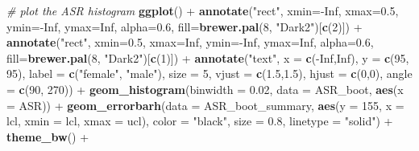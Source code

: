 \documentclass[]{article}
\newenvironment{Shaded}{\begin{snugshade}}{\end{snugshade}}
\newcommand{\KeywordTok}[1]{\textcolor[rgb]{0.13,0.29,0.53}{\textbf{{#1}}}}
\newcommand{\DataTypeTok}[1]{\textcolor[rgb]{0.13,0.29,0.53}{{#1}}}
\newcommand{\DecValTok}[1]{\textcolor[rgb]{0.00,0.00,0.81}{{#1}}}
\newcommand{\FloatTok}[1]{\textcolor[rgb]{0.00,0.00,0.81}{{#1}}}
\newcommand{\StringTok}[1]{\textcolor[rgb]{0.31,0.60,0.02}{{#1}}}
\newcommand{\CommentTok}[1]{\textcolor[rgb]{0.56,0.35,0.01}{\textit{{#1}}}}
\newcommand{\OtherTok}[1]{\textcolor[rgb]{0.56,0.35,0.01}{{#1}}}
\newcommand{\NormalTok}[1]{{#1}}
\begin{document}
\begin{Shaded}
\begin{Highlighting}[]
\CommentTok{# plot the ASR histogram}
\KeywordTok{ggplot}\NormalTok{() +}
\StringTok{  }\KeywordTok{annotate}\NormalTok{(}\StringTok{"rect"}\NormalTok{, }\DataTypeTok{xmin=}\NormalTok{-}\OtherTok{Inf}\NormalTok{, }\DataTypeTok{xmax=}\FloatTok{0.5}\NormalTok{, }\DataTypeTok{ymin=}\NormalTok{-}\OtherTok{Inf}\NormalTok{, }\DataTypeTok{ymax=}\OtherTok{Inf}\NormalTok{, }\DataTypeTok{alpha=}\FloatTok{0.6}\NormalTok{,}
           \DataTypeTok{fill=}\KeywordTok{brewer.pal}\NormalTok{(}\DecValTok{8}\NormalTok{, }\StringTok{"Dark2"}\NormalTok{)[}\KeywordTok{c}\NormalTok{(}\DecValTok{2}\NormalTok{)]) +}
\StringTok{  }\KeywordTok{annotate}\NormalTok{(}\StringTok{"rect"}\NormalTok{, }\DataTypeTok{xmin=}\FloatTok{0.5}\NormalTok{, }\DataTypeTok{xmax=}\OtherTok{Inf}\NormalTok{, }\DataTypeTok{ymin=}\NormalTok{-}\OtherTok{Inf}\NormalTok{, }\DataTypeTok{ymax=}\OtherTok{Inf}\NormalTok{, }\DataTypeTok{alpha=}\FloatTok{0.6}\NormalTok{,}
           \DataTypeTok{fill=}\KeywordTok{brewer.pal}\NormalTok{(}\DecValTok{8}\NormalTok{, }\StringTok{"Dark2"}\NormalTok{)[}\KeywordTok{c}\NormalTok{(}\DecValTok{1}\NormalTok{)]) +}
\StringTok{  }\KeywordTok{annotate}\NormalTok{(}\StringTok{"text"}\NormalTok{, }\DataTypeTok{x =} \KeywordTok{c}\NormalTok{(-}\OtherTok{Inf}\NormalTok{,}\OtherTok{Inf}\NormalTok{), }\DataTypeTok{y =} \KeywordTok{c}\NormalTok{(}\DecValTok{95}\NormalTok{, }\DecValTok{95}\NormalTok{),}
           \DataTypeTok{label =} \KeywordTok{c}\NormalTok{(}\StringTok{"female"}\NormalTok{, }\StringTok{"male"}\NormalTok{), }\DataTypeTok{size =} \DecValTok{5}\NormalTok{,}
           \DataTypeTok{vjust =} \KeywordTok{c}\NormalTok{(}\FloatTok{1.5}\NormalTok{,}\FloatTok{1.5}\NormalTok{), }\DataTypeTok{hjust =} \KeywordTok{c}\NormalTok{(}\DecValTok{0}\NormalTok{,}\DecValTok{0}\NormalTok{), }\DataTypeTok{angle =} \KeywordTok{c}\NormalTok{(}\DecValTok{90}\NormalTok{, }\DecValTok{270}\NormalTok{)) +}
\StringTok{  }\KeywordTok{geom_histogram}\NormalTok{(}\DataTypeTok{binwidth =} \FloatTok{0.02}\NormalTok{, }\DataTypeTok{data =} \NormalTok{ASR_boot, }\KeywordTok{aes}\NormalTok{(}\DataTypeTok{x =} \NormalTok{ASR)) +}
\StringTok{  }\KeywordTok{geom_errorbarh}\NormalTok{(}\DataTypeTok{data =} \NormalTok{ASR_boot_summary, }\KeywordTok{aes}\NormalTok{(}\DataTypeTok{y =} \DecValTok{155}\NormalTok{, }\DataTypeTok{x =} \NormalTok{lcl, }\DataTypeTok{xmin =} \NormalTok{lcl, }\DataTypeTok{xmax =} \NormalTok{ucl), }
                 \DataTypeTok{color =} \StringTok{"black"}\NormalTok{, }\DataTypeTok{size =} \FloatTok{0.8}\NormalTok{, }\DataTypeTok{linetype =} \StringTok{"solid"}\NormalTok{) +}
\StringTok{  }\KeywordTok{theme_bw}\NormalTok{() +}

\end{Highlighting}
\end{Shaded}
\end{document}
